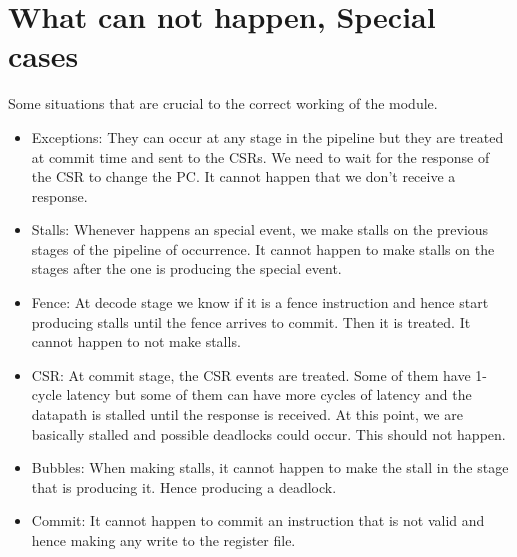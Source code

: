 \section{What can not happen, Special cases}
\label{chapter-6}
Some situations that are crucial to the correct working of the module.

\begin{itemize}
	\item Exceptions: They can occur at any stage in the pipeline but they are treated at commit time and sent to the CSRs. We need to wait for the response of the CSR to change the PC. It cannot happen that we don't receive a response.
	\item Stalls: Whenever happens an special event, we make stalls on the previous stages of the pipeline of occurrence.  It cannot happen to make stalls on the stages after the one is producing the special event.
	\item Fence: At decode stage we know if it is a fence instruction and hence start producing stalls until the fence arrives to commit. Then it is treated. It cannot happen to not make stalls.
	\item CSR: At commit stage, the CSR events are treated. Some of them have 1-cycle latency but some of them can have more cycles of latency and the datapath is stalled until the response is received. At this point, we are basically stalled and possible deadlocks could occur. This should not happen.
	\item Bubbles: When making stalls, it cannot happen to make the stall in the stage that is producing it. Hence producing  a deadlock.
	\item Commit: It cannot happen to commit an instruction that is not valid and hence making any write to the register file.
	
\end{itemize}

    